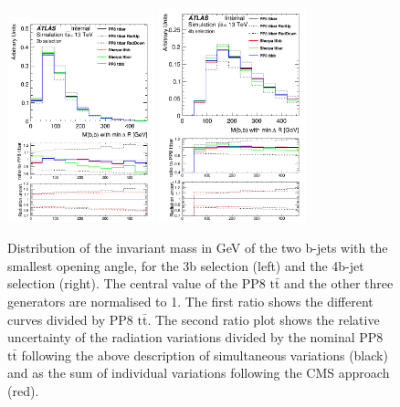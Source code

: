 \begin{figure}[!htb]
\centering
\includegraphics[width=0.38\textwidth]{Plots/ttbb/hisgenEvt_M_MinDeltaRGenBJets_4j3t__div}
\includegraphics[width=0.38\textwidth]{Plots/ttbb/hisgenEvt_M_MinDeltaRGenBJets_4j4t__div}
  \caption{Distribution of the invariant mass in GeV of the two b-jets with the smallest opening angle, for the 3b selection (left) and the 4b-jet selection (right). The central value of the PP8 $\mathrm{t\bar{t}}$ and the other three generators are normalised to 1. The first ratio shows the different curves divided by PP8 $\mathrm{t\bar{t}}$. The second ratio plot shows the relative uncertainty of the radiation variations divided by the nominal PP8 $\mathrm{t\bar{t}}$ following the above description of simultaneous variations (black) and as the sum of individual variations following the CMS approach (red). \label{ttbb:MbbminDR}}
\end{figure}

